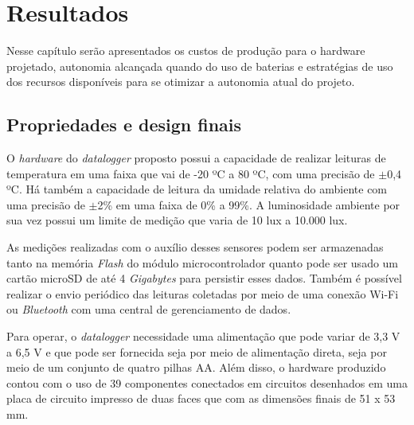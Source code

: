 \chapter{Resultados}
\label{chap:resultados}

Nesse capítulo serão apresentados os custos de produção para o hardware projetado, autonomia alcançada quando do uso de baterias e estratégias de uso dos recursos disponíveis para se otimizar a autonomia atual do projeto.


\section{Propriedades e design finais}

O \textit{hardware} do \textit{datalogger} proposto possui a capacidade de realizar leituras de temperatura em uma faixa que vai de -20 ºC a 80 ºC, com uma precisão de $\pm$0,4 ºC. Há também a capacidade de leitura da umidade relativa do ambiente com uma precisão de $\pm$2\% em uma faixa de 0\% a 99\%. A luminosidade ambiente por sua vez possui um limite de medição que varia de 10 lux a 10.000 lux. 

As medições realizadas com o auxílio desses sensores podem ser armazenadas tanto na memória \textit{Flash} do módulo microcontrolador quanto pode ser usado um cartão microSD de até 4 \textit{Gigabytes} para persistir esses dados. Também é possível realizar o envio periódico das leituras coletadas por meio de uma conexão Wi-Fi ou \textit{Bluetooth} com uma central de gerenciamento de dados. 

Para operar, o \textit{datalogger} necessidade uma alimentação que pode variar de 3,3 V a 6,5 V e que pode ser fornecida seja por meio de alimentação direta, seja por meio de um conjunto de quatro pilhas AA. Além disso, o hardware produzido contou com o uso de 39 componentes conectados em circuitos desenhados em uma placa de circuito impresso de duas faces que com as dimensões finais de 51 x 53 mm. 

    \begin{figure}[h!]
            \captionsetup{width=10cm}
   \end{figure}





